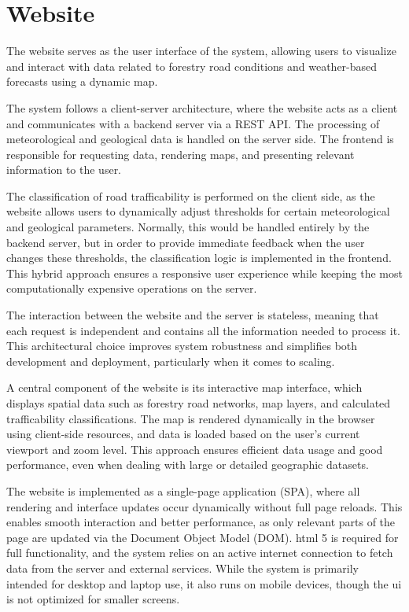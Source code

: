 \section{Website}
The website serves as the user interface of the system, allowing users to visualize and interact with data related to forestry road conditions and weather-based forecasts using a dynamic map.

The system follows a client-server architecture, where the website acts as a client and communicates with a backend server via a REST API. The processing of meteorological and geological data is handled on the server side. The frontend is responsible for requesting data, rendering maps, and presenting relevant information to the user.

The classification of road trafficability is performed on the client side, as the website allows users to dynamically adjust thresholds for certain meteorological and geological parameters. Normally, this would be handled entirely by the backend server, but in order to provide immediate feedback when the user changes these thresholds, the classification logic is implemented in the frontend. This hybrid approach ensures a responsive user experience while keeping the most computationally expensive operations on the server.

The interaction between the website and the server is stateless, meaning that each request is independent and contains all the information needed to process it. This architectural choice improves system robustness and simplifies both development and deployment, particularly when it comes to scaling.

A central component of the website is its interactive map interface, which displays spatial data such as forestry road networks, map layers, and calculated trafficability classifications. The map is rendered dynamically in the browser using client-side resources, and data is loaded based on the user’s current viewport and zoom level. This approach ensures efficient data usage and good performance, even when dealing with large or detailed geographic datasets.

The website is implemented as a single-page application (SPA), where all rendering and interface updates occur dynamically without full page reloads. This enables smooth interaction and better performance, as only relevant parts of the page are updated via the Document Object Model (DOM). \acrshort{html} 5 is required for full functionality, and the system relies on an active internet connection to fetch data from the server and external services. While the system is primarily intended for desktop and laptop use, it also runs on mobile devices, though the \acrshort{ui} is not optimized for smaller screens.

